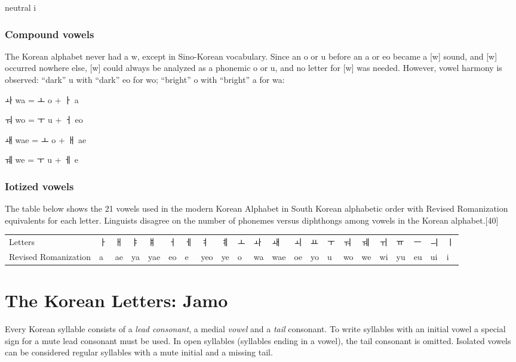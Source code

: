 neutral  i

\subsubsection{Compound vowels}

The Korean alphabet never had a w, except in Sino-Korean vocabulary. Since an o or u before an a or eo became a [w] sound, and [w] occurred nowhere else, [w] could always be analyzed as a phonemic o or u, and no letter for [w] was needed. However, vowel harmony is observed: \enquote{dark}  u with \enquote{dark}  eo for  wo; \enquote{bright}  o with \enquote{bright}  a for  wa:

{\korean
ㅘ wa = ㅗ o + ㅏ a

ㅝ wo = ㅜ u + ㅓ eo

ㅙ wae = ㅗ o + ㅐ ae

ㅞ we = ㅜ u + ㅔ e
}


\subsubsection{Iotized vowels}



The table below shows the 21 vowels used in the modern Korean Alphabet in South Korean alphabetic order with Revised Romanization equivalents for each letter. Linguists disagree on the number of phonemes versus diphthongs among vowels in the Korean alphabet.[40]

\bigskip

\begingroup
\setlength{\tabcolsep}{2pt}
\korean
\begin{tabular}{p{2cm}lllllllllllllllllllll}
Letters       &ㅏ &ㅐ	&ㅑ	&ㅒ	&ㅓ	&ㅔ	&ㅕ	&ㅖ	&ㅗ	&ㅘ	&ㅙ	&ㅚ	&ㅛ	&ㅜ	&ㅝ	&ㅞ	&ㅟ	&ㅠ	&ㅡ	&ㅢ	&ㅣ\\
Revised Romanization	&a	&ae	&ya	&yae	&eo	&e	 &yeo	&ye	&o	&wa	&wae	&oe	&yo	&u	&wo	&we	&wi	&yu	&eu	&ui	&i\\
\end{tabular}
\endgroup

\section{The Korean Letters: Jamo}

Every Korean syllable consists of a \textit{lead consonant}, a medial \textit{vowel} and a \textit{tail} consonant. To write syllables with an initial vowel  a special sign for a mute lead consonant must be used. In open syllables (syllables ending in a vowel), the tail consonant is omitted. Isolated vowels can be considered regular syllables with a mute initial and a missing tail.

